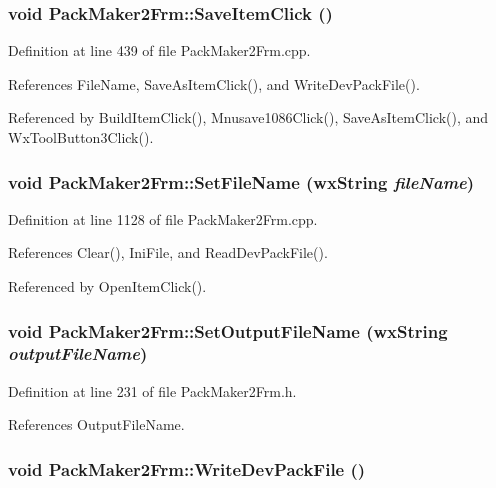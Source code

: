 \subsubsection{\setlength{\rightskip}{0pt plus 5cm}void Pack\-Maker2Frm::Save\-Item\-Click ()}\label{class_pack_maker2_frm_48be5e5bb1151e9d6f3c245c08d4de45}




Definition at line 439 of file Pack\-Maker2Frm.cpp.

References File\-Name, Save\-As\-Item\-Click(), and Write\-Dev\-Pack\-File().

Referenced by Build\-Item\-Click(), Mnusave1086Click(), Save\-As\-Item\-Click(), and Wx\-Tool\-Button3Click().
\subsubsection{\setlength{\rightskip}{0pt plus 5cm}void Pack\-Maker2Frm::Set\-File\-Name (wx\-String {\em file\-Name})}\label{class_pack_maker2_frm_f2d52a54c5f6666fc7e9c98fc82b78ab}




Definition at line 1128 of file Pack\-Maker2Frm.cpp.

References Clear(), Ini\-File, and Read\-Dev\-Pack\-File().

Referenced by Open\-Item\-Click().
\subsubsection{\setlength{\rightskip}{0pt plus 5cm}void Pack\-Maker2Frm::Set\-Output\-File\-Name (wx\-String {\em output\-File\-Name})\hspace{0.3cm}{\tt  [inline]}}\label{class_pack_maker2_frm_bd5da18ab1d75038c870258891240510}




Definition at line 231 of file Pack\-Maker2Frm.h.

References Output\-File\-Name.
\subsubsection{\setlength{\rightskip}{0pt plus 5cm}void Pack\-Maker2Frm::Write\-Dev\-Pack\-File ()}\label{class_pack_maker2_frm_b81ab3db082c1408e674ccd0fe6eb1be}




